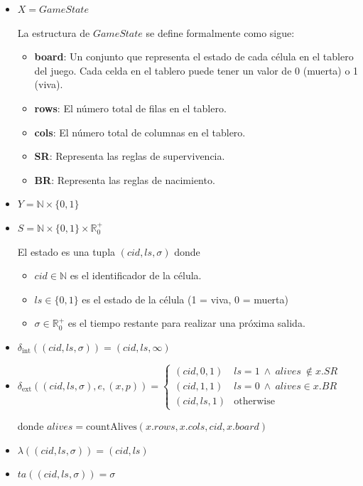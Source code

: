 \documentclass[]{article}
\newcommand{\dint}{\delta_{\text{int}}}
\newcommand{\dext}{\delta_{\text{ext}}}
\newcommand{\estado}{(cid,ls,\sigma)}
\newcommand{\R}{\mathbb{R}}
\newcommand{\N}{\mathbb{N}}
\begin{document}
\begin{itemize}
  \item $X = GameState$


        La estructura de $GameState$ se define formalmente como sigue:

        \begin{itemize}
          \item \textbf{board}: Un conjunto que representa el estado de cada célula en el tablero del juego. Cada celda en el tablero puede tener un valor de 0 (muerta) o 1 (viva).
          \item \textbf{rows}: El número total de filas en el tablero.
          \item \textbf{cols}: El número total de columnas en el tablero.
          \item \textbf{SR}: Representa las reglas de supervivencia.
          \item \textbf{BR}: Representa las reglas de nacimiento.
        \end{itemize}



  \item $Y = \N \times \{0,1\}$

  \item $S = \N \times \{0, 1\} \times  \R_0^+$

        El estado es una tupla $(cid, ls, \sigma)$ donde

        \begin{itemize}
          \item $cid \in \N$ es el identificador de la célula.
          \item $ls \in \{0, 1\}$ es el estado de la célula (1 = viva, 0 = muerta)
          \item $\sigma \in \R_0^+$ es el tiempo restante para realizar una próxima salida.
        \end{itemize}

  \item $\dint(\estado) = (cid,ls,\infty)$

  \item $\dext(\estado, e, (x, p)) = \begin{cases}
            (cid,0,1)  & ls = 1 \ \land \ alives \ \not \in x.SR \\
            (cid,1,1)  & ls = 0 \ \land \ alives \in x.BR        \\
            (cid,ls,1) & \text{otherwise }
          \end{cases}$

        donde $alives = \text{countAlives}(x.rows,x.cols,cid,x.board)$
  \item $\lambda(\estado) = (cid,ls) $
  \item $ta(\estado) = \sigma$
\end{itemize}
\end{document}

